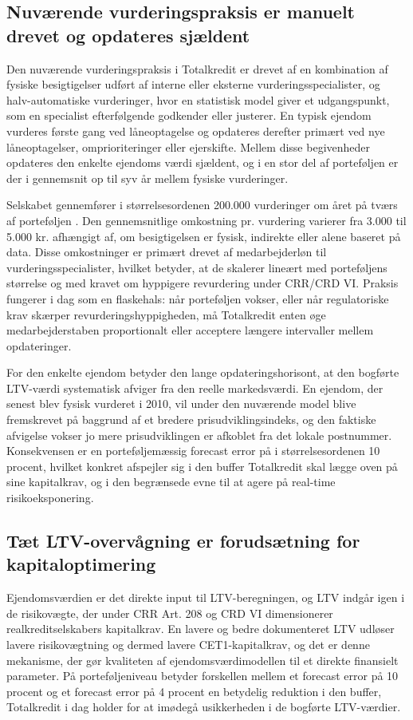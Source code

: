 \documentclass[12pt]{article}
\begin{document}
\subsection{Nuværende vurderingspraksis er manuelt drevet og opdateres sjældent}
\label{sec:sit-praksis}
Den nuværende vurderingspraksis i Totalkredit er drevet af en kombination af fysiske besigtigelser udført af interne eller eksterne vurderingsspecialister, og halv-automatiske vurderinger, hvor en statistisk model giver et udgangspunkt, som en specialist efterfølgende godkender eller justerer. En typisk ejendom vurderes første gang ved låneoptagelse og opdateres derefter primært ved nye låneoptagelser, omprioriteringer eller ejerskifte. Mellem disse begivenheder opdateres den enkelte ejendoms værdi sjældent, og i en stor del af porteføljen er der i gennemsnit op til syv år mellem fysiske vurderinger.

Selskabet gennemfører i størrelsesordenen 200.000 vurderinger om året på tværs af porteføljen \parencite{totalkredit2023}. Den gennemsnitlige omkostning pr. vurdering varierer fra 3.000 til 5.000 kr. afhængigt af, om besigtigelsen er fysisk, indirekte eller alene baseret på data. Disse omkostninger er primært drevet af medarbejderløn til vurderingsspecialister, hvilket betyder, at de skalerer lineært med porteføljens størrelse og med kravet om hyppigere revurdering under CRR/CRD VI. Praksis fungerer i dag som en flaskehals: når porteføljen vokser, eller når regulatoriske krav skærper revurderingshyppigheden, må Totalkredit enten øge medarbejderstaben proportionalt eller acceptere længere intervaller mellem opdateringer.

For den enkelte ejendom betyder den lange opdateringshorisont, at den bogførte LTV-værdi systematisk afviger fra den reelle markedsværdi. En ejendom, der senest blev fysisk vurderet i 2010, vil under den nuværende model blive fremskrevet på baggrund af et bredere prisudviklingsindeks, og den faktiske afvigelse vokser jo mere prisudviklingen er afkoblet fra det lokale postnummer. Konsekvensen er en porteføljemæssig forecast error på i størrelsesordenen 10 procent, hvilket konkret afspejler sig i den buffer Totalkredit skal lægge oven på sine kapitalkrav, og i den begrænsede evne til at agere på real-time risikoeksponering.

\subsection{Tæt LTV-overvågning er forudsætning for kapitaloptimering}
\label{sec:sit-ambition}
Ejendomsværdien er det direkte input til LTV-beregningen, og LTV indgår igen i de risikovægte, der under CRR Art. 208 og CRD VI dimensionerer realkreditselskabers kapitalkrav. En lavere og bedre dokumenteret LTV udløser lavere risikovægtning og dermed lavere CET1-kapitalkrav, og det er denne mekanisme, der gør kvaliteten af ejendomsværdimodellen til et direkte finansielt parameter. På porteføljeniveau betyder forskellen mellem et forecast error på 10 procent og et forecast error på 4 procent en betydelig reduktion i den buffer, Totalkredit i dag holder for at imødegå usikkerheden i de bogførte LTV-værdier.
\end{document}
